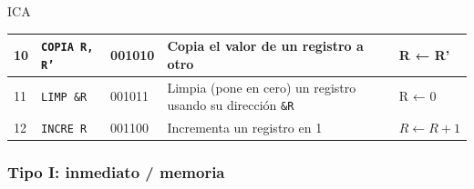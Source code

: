ICA\documentclass{article}
\begin{document}
\begin{longtable}{|p{}|p{}|p{}|p{}|p{}|}
  \hline
  10              & \texttt{COPIA R, R'}        & 001010                          & Copia el valor de un registro a otro                               & R ← R'                                     \\
  \hline
  11              & \texttt{LIMP \&R}           & 001011                          & Limpia (pone en cero) un registro usando su dirección \texttt{\&R} & R ← 0                                      \\
  \hline
  12              & \texttt{INCRE R}            & 001100                          & Incrementa un registro en 1                                        & $R \leftarrow R + 1$                       \\
  \hline
\end{longtable}

\subsubsection{Tipo I: \textbf{inmediato / memoria}}
\end{document}
